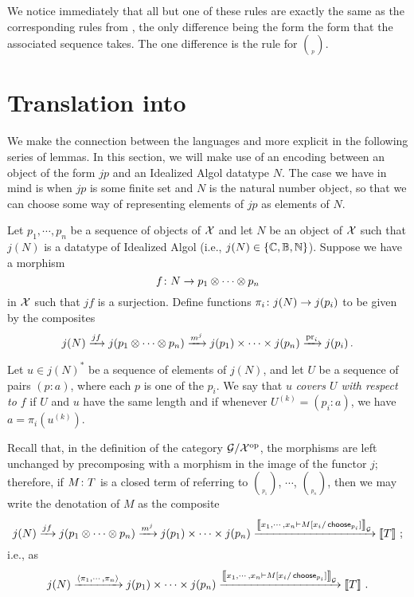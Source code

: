 We notice immediately that all but one of these rules are exactly the same as the corresponding rules from \IAX, the only difference being the form the form that the associated sequence takes.  
The one difference is the rule for $\choose_p$.

\section{Translation into \IAX}

We make the connection between the languages \IAX and \IAXX more explicit in the following series of lemmas.
In this section, we will make use of an encoding between an object of the form $jp$ and an Idealized Algol datatype $N$.  
The case we have in mind is when $jp$ is some finite set and $N$ is the natural number object, so that we can choose some way of representing elements of $jp$ as elements of $N$.

\begin{definition}
  Let $p_1,\cdots,p_n$ be a sequence of objects of $\mathcal X$ and let $N$ be an object of $\mathcal X$ such that $j(N)$ is a datatype of Idealized Algol (i.e., $j(N)\in\{\mathbb{C},\mathbb{B},\mathbb{N}\}$).  
  Suppose we have a morphism
  \[
    f \colon N \to p_1 \otimes \cdots \otimes p_n
    \]
  in $\mathcal X$ such that $jf$ is a surjection.  
  Define functions $\pi_i\colon j(N) \to j(p_i)$ to be given by the composites
  \[
    j(N) \xrightarrow{jf} j(p_1 \otimes \cdots \otimes p_n) \xrightarrow{m^j} j(p_1) \times \cdots \times j(p_n) \xrightarrow{\operatorname{pr}_i} j(p_i)\,.
    \]

  Let $u\in j(N)^*$ be a sequence of elements of $j(N)$, and let $U$ be a sequence of pairs $(p:a)$, where each $p$ is one of the $p_i$.  
  We say that $u$ \emph{covers $U$ with respect to $f$} if $U$ and $u$ have the same length and if whenever $U^{(k)}=(p_i:a)$, we have $a = \pi_i(u^{(k)})$.
  \label{DefCovers}
\end{definition}

Recall that, in the definition of the category $\mathcal G/\mathcal X^{\mathrm{op}}$, the \Mellies morphisms are left unchanged by precomposing with a morphism in the image of the functor $j$; therefore, if $M\colon T$ is a closed term of \IAXX referring to $\choose_{p_1}$, $\cdots$, $\choose_{p_n}$, then we may write the denotation of $M$ as the composite
\[
  j(N) \xrightarrow{jf} j(p_1 \otimes \cdots \otimes p_n) \xrightarrow{m^j} j(p_1) \times \cdots \times j(p_n) \xrightarrow{\left\llbracket x_1,\cdots,x_n\mathbin{\vdash} M[x_i/\operatorname{\mathsf{choose}}_{p_i}]\right\rrbracket_\mathcal G} \left\llbracket T\right\rrbracket\,;
  \]
i.e., as
\[
  j(N) \xrightarrow{\langle \pi_1,\cdots,\pi_n\rangle} j(p_1) \times \cdots \times j(p_n) \xrightarrow{\left\llbracket x_1,\cdots,x_n\mathbin{\vdash} M[x_i/\operatorname{\mathsf{choose}}_{p_i}]\right\rrbracket_\mathcal G} \left\llbracket T\right\rrbracket\,.
  \]


